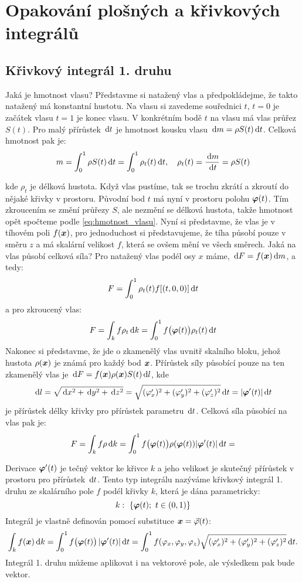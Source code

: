 \section{Opakování plošných a křivkových integrálů}


\subsection{Křivkový integrál 1. druhu}
Jaká je hmotnost vlasu? Představme si natažený vlas a předpokládejme, že takto natažený má konstantní hustotu. 
Na vlasu si zavedeme souřednici $t$, $t=0$ je začátek vlasu $t=1$ je konec vlasu.
V konkrétním bodě $t$ na vlasu má vlas průřez $S(t)$. Pro malý přírůstek $\,{\rm d} t$ je hmotnost kousku vlasu $\,{\rm d} m = \rho S(t)\,{\rm d} t$.
Celková hmotnost pak je:
\begin{equation}
    \label{eq:hmotnost_vlasu}    
    m=\int_0^1 \rho S(t) \,{\rm d} t = \int_0^1 \rho_t(t) \,{\rm d} t,\quad \rho_t(t) = \frac{\,{\rm d} m}{\,{\rm d} t}= \rho S(t)
\end{equation}


kde $\rho_t$ je délková hustota. Když vlas pustíme, tak se trochu zkrátí a zkroutí do nějaké křivky v prostoru. Původní bod $t$ má nyní v prostoru polohu 
$\mathbf{\boldsymbol{\varphi}}(t)$. Tím zkroucením se změní průřezy $S$, ale nezmění se délková hustota, takže hmotnost opět spočteme podle \ref{eq:hmotnost_vlasu}.
Nyní si představme, že vlas je v tíhovém poli $f(\mathbf{\boldsymbol{x}})$, pro jednoduchost si představujeme, že tíha působí pouze v směru $z$ a má skalární velikost $f$,
která se ovšem mění ve všech směrech. Jaká na vlas působí celková síla? Pro natažený vlas podél osy $x$ máme, $\,{\rm d} F = f(\mathbf{\boldsymbol{x}}) \,{\rm d} m$, a tedy:
\[
  F = \int_0^1 \rho_t(t) f[(t,0,0)] \,{\rm d} t
\]
a pro zkroucený vlas:
\[
   F=\int_k f \rho_t \,{\rm d} k = \int_0^1 f\big(\mathbf{\boldsymbol{\varphi}}(t)\big)\rho_t(t) \,{\rm d}{t}
\]
Nakonec si představme, že jde o zkamenělý vlas uvnitř skalního bloku, jehož hustota $\rho(\mathbf{\boldsymbol{x}})$ je známá pro každý bod $\mathbf{\boldsymbol{x}}$. Přírůstek síly působící
pouze na ten zkamenělý vlas je $\,{\rm d} F = f(\mathbf{\boldsymbol{x}}) \rho(\mathbf{\boldsymbol{x}}) S(t) \,{\rm d} l$, kde 
\[
    \,{\rm d} l = \sqrt{ \,{\rm d} x^2 + \,{\rm d} y^2 + \,{\rm d} z^2 } = \sqrt{ (\varphi_x')^2+(\varphi_y')^2+(\varphi_z')^2} \,{\rm d}{t} = \lvert\mathbf{\boldsymbol{\varphi}}'(t)\rvert \,{\rm d}{t}
\]
 je přírůstek délky křivky pro přírůstek parametru $\,{\rm d} t$. Celková síla působící na vlas pak je:
\[
   F=\int_k f \rho \,{\rm d} k = \int_0^1 f\big(\mathbf{\boldsymbol{\varphi}}(t)\big)\rho( \mathbf{\boldsymbol{\varphi}}(t)) \lvert\mathbf{\boldsymbol{\varphi}}'(t)\rvert \,{\rm d}{t}=
\]

Derivace $\mathbf{\boldsymbol{\varphi}}'(t)$ je tečný vektor ke křivce $k$ a jeho velikost je skutečný přírůstek v prostoru pro přírůstek $\,{\rm d} t$.
Tento typ integrálu nazýváme křivkový integrál 1. druhu ze skalárního pole $f$ podél křivky $k$, která je dána parametricky:
\[
   k:\ \{ \mathbf{\boldsymbol{\varphi}}(t);\ t\in (0,1)\}
\]
Integrál je vlastně definován pomocí substituce $\mathbf{\boldsymbol{x}} = \vec {\varphi}(t)$:
\begin{equation}
   \label{eq:curve_1_int}
   \int_k f(\mathbf{\boldsymbol{x}}) \,{\rm d} k = \int_0^1 f\big(\mathbf{\boldsymbol{\varphi}}(t)\big)\, \lvert\mathbf{\boldsymbol{\varphi}}'(t)\rvert \,{\rm d}{t}=
   \int_0^1 f(\varphi_x,\varphi_y,\varphi_z) \sqrt{ (\varphi_x')^2+(\varphi_y')^2+(\varphi_z')^2} \,{\rm d}{t}.
\end{equation}
Integrál 1. druhu můžeme aplikovat i na vektorové pole, ale výsledkem pak bude vektor. 


